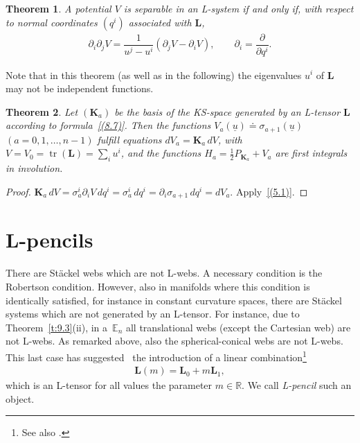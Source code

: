 \documentclass[pdftex]{sigma}
\def\bs{\boldsymbol}
\numberwithin{equation}{section}
\newtheorem{Theorem}{Theorem}[section]
 { \theoremstyle{definition}
\newtheorem{Notation}[Theorem]{Notation}
\newtheorem{Example}[Theorem]{Example}
\newtheorem{Remark}[Theorem]{Remark}
\newtheorem{Remarks}[Theorem]{Remarks}
 }
\begin{document}
\begin{Theorem}
A potential $V$ is separable in an L-system if and only if, with respect to  normal coordinates $(q^i)$ associated with $\bs L$,
\begin{gather*}
\partial_i\partial_jV=\dfrac 1{u^j-u^i} (\partial_jV-\partial_iV),\qquad  \partial_i=\dfrac{ \partial}{\partial q^i}.
\end{gather*}
\end{Theorem}

Note that in this theorem (as well as in the following) the eigenvalues $u^i$ of $\bs L$ may not be independent functions.

\begin{Theorem}
Let $(\bs K_a)$ be the basis of the KS-space generated by an L-tensor $\bs L$ according to formula~\eqref{(8.7)}. Then the functions $V_a(\underline u)\doteq \sigma_{a+1}(\underline u)$ $(a=0,1,\ldots, n-1)$ fulfill equations
$dV_a=\bs K_a\,dV$, with $V=V_0=\operatorname{tr}(\bs L)=\sum_iu^i$, and
the functions $H_a=\tfrac 12 P_{\bs K_a}+V_a$ are first integrals in involution.
\end{Theorem}

\begin{proof}
$\bs K_a\,dV=\sigma_a^i \partial_iV\,dq^i=\sigma_a^i\,dq^i=\partial_i\sigma_{a+1}\,dq^i=dV_a$. Apply~\eqref{(5.1)}.
\end{proof}



\section{L-pencils}\label{section11}

There are St\"ackel webs which are not L-webs. A necessary condition is the Robertson condition. However, also in manifolds where this condition is identically satisf\/ied, for instance in constant curvature spaces, there are St\"ackel systems which are not generated by an L-tensor. For instance, due to Theorem~\ref{t:9.3}(ii), in a~$\mathbb E_n$ all translational webs (except the Cartesian web) are not L-webs. As remarked above, also the spherical-conical webs are not L-webs. This last case has suggested~\cite{Benenti-1992b} the introduction of a linear combination\footnote{See also \cite{Benenti-2008}.\label{pagenote3}}
\begin{gather*}
\bs L(m)=\bs L_0+m\bs L_1,
\end{gather*}
which is an L-tensor for all values the parameter $m\in \mathbb R$. We call {\it L-pencil} such an object.
\end{document}
